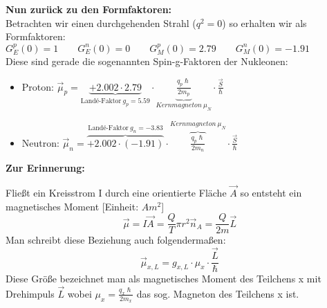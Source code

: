 \documentclass[Ex4_Zusammenfassung.tex]{subfiles}
\begin{document}
\textbf{Nun zurück zu den Formfaktoren:} \\ \newline
Betrachten wir einen durchgehenden Strahl ($q^2=0$) so erhalten wir als Formfaktoren: 
$G_E^p(0)=1 \qquad G_E^n(0)=0 \qquad G_M^p(0)=2.79 \qquad G_M^n(0) = -1.91 $ \\ \newline
Diese sind gerade die sogenannten Spin-g-Faktoren der Nukleonen:
\begin{itemize}
\item Proton: $\vec \mu_p = \underbrace{+2.002 \cdot 2.79}_{\text{Landé-Faktor} \ g_p=5.59} \cdot \underbrace{\frac{q_p \hslash}{2m_p}}_{Kernmagneton \  \mu_N} \cdot \frac{\vec S}{\hslash} $
\item Neutron: $\vec \mu_n = \overbrace{+2.002 \cdot (-1.91)}^{\text{Landé-Faktor} \ g_n=-3.83} \cdot \overbrace{\frac{q_p \hslash}{2 m_n}}^{Kernmagneton \  \mu_N} \cdot \frac{\vec S}{\hslash} $
\end{itemize}
\textbf{Zur Erinnerung:} 

Fließt ein Kreisstrom I durch eine orientierte Fläche $\vec A$ so entsteht ein magnetisches Moment [Einheit: $Am^2$]
\begin{equation}
\vec \mu = I \vec A = \frac{Q}{T} \pi r^2 \vec n_A = \frac{Q}{2m} \vec L 
\end{equation}
Man schreibt diese Beziehung auch folgendermaßen:
\begin{equation}
\vec \mu_{x,L} = g_{x,L} \cdot \mu_x \cdot \frac{\vec L}{\hslash}
\end{equation}
Diese Größe bezeichnet man als magnetisches Moment des Teilchens x mit Drehimpuls $\vec L$ wobei $\mu_x = \frac{q_x \hslash}{2 m_x}$ das sog. Magneton des Teilchens x ist. 
\end{document}
